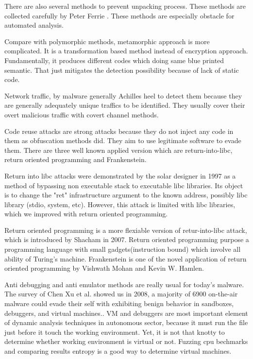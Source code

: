 There are also several methods to prevent unpacking process. These methods are collected carefully by Peter Ferrie \cite{ferrie2008anti}. These methods are especially obstacle for automated analysis.

Compare with polymorphic methods, metamorphic approach is more complicated. It is a transformation based method instead of encryption  approach.\cite{konstantinou2008metamorphic} Fundamentally, it produces different codes which doing same blue printed semantic. That just mitigates the detection possibility because of lack of static code. 

Network traffic,  by malware  generally Achilles heel to detect them because they are generally adequately unique traffics to be identified\cite{marpaung2012survey}. They usually cover their overt malicious traffic with covert channel methods.\cite{rutkowska2006rootkits}

Code reuse attacks are strong attacks because they do not inject any code in them as obfuscation methods did. They aim to use legitimate software to evade them. There are three well known applied version which are return-into-libc, return oriented programming and Frankenstein.

Return into libc attacks were demonstrated by the solar designer in 1997 as a method of bypassing non executable stack to executable libc libraries\cite{designer1997getting}. Its object is to change the "ret" infrastructure argument to the known address, possibly libc library (stdio, system, etc). However, this attack is limited with libc libraries, which we improved with return oriented programming. 

Return oriented programming is a more flexiable version of retur-into-libc attack, which is introduced by Shacham in 2007\cite{shacham2007geometry}. Return oriented programming purpose a programming language with small gadgets(instruction bound) which involve all ability of Turing's machine\cite{roemer2012return}. Frankenstein is one of the novel application of return oriented programming by Vishwath Mohan and Kevin W. Hamlen\cite{mohan2012frankenstein}.

Anti debugging and anti emulator methods are really usual for today's malware. The survey of Chen Xu et al. showed us in 2008, a majority of 6900 on-the-air malware could evade their self with exhibiting benign behavior in sandboxes, debuggers, and virtual machines.\cite{chen2008towards}. VM and debuggers are most important element of dynamic analysis techniques in autonomous sector, because it must run the file just before it touch the working environment. Yet, it is not that knotty to determine whether working environment is virtual or not. Fuzzing cpu bechmarks and comparing results entropy is a good way to determine virtual machines.\cite{franklin2008remote}

